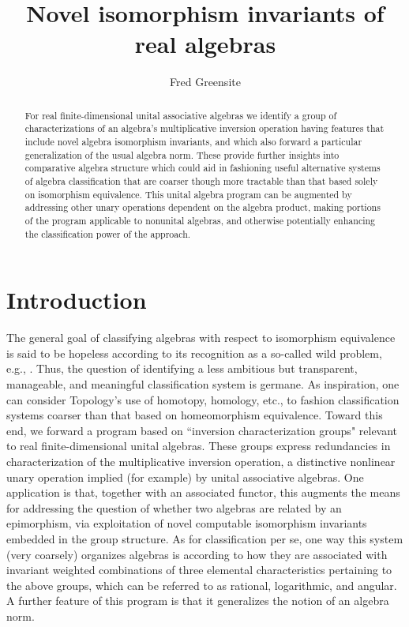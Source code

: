\documentclass{amsart}
\numberwithin{equation}{section}
\theoremstyle{definition}
\numberwithin{theorem}{section}
\begin{document}
       
             \title{Novel isomorphism invariants of real algebras}
    \author{Fred Greensite}
    
   \begin{abstract}  For real finite-dimensional unital associative algebras we identify a group of characterizations of an algebra's multiplicative inversion operation having features that include novel algebra isomorphism invariants, and which also forward a particular generalization of the usual algebra norm.  These provide further insights into comparative algebra structure which could aid in fashioning useful alternative systems of algebra classification that are coarser though more tractable than that based solely on isomorphism equivalence.  This unital algebra program can be augmented by addressing other unary operations dependent on the algebra product, making portions of the program applicable to nonunital algebras, and otherwise potentially enhancing the classification power of the approach.     
   \end{abstract}
        
  \maketitle
  
 \tableofcontents
 
  \section{Introduction} The general goal of classifying algebras with respect to isomorphism equivalence is said to be hopeless according to its recognition as a so-called wild problem, e.g., \cite{drozd:1972,prest:1991,sergeichuk:2000,belitskii:2005}.   Thus, the question of identifying a less ambitious but transparent, manageable, and meaningful classification system is germane.  As inspiration, one can consider Topology's use of homotopy, homology, etc., to fashion classification systems coarser than that based on homeomorphism equivalence.  Toward this end, we forward a program based on  ``inversion characterization groups" relevant to real finite-dimensional unital algebras.  These groups express redundancies in characterization of the multiplicative inversion operation, a distinctive nonlinear unary operation implied (for example) by unital associative algebras. One application is that, together with an associated functor, this augments the means for addressing the question of whether two algebras are related by an epimorphism, via exploitation of novel computable isomorphism invariants embedded in the group structure. As for classification per se, one way this system (very coarsely) organizes algebras is according to how they are associated with invariant weighted combinations of three elemental characteristics pertaining to the above groups, which can be referred to as rational, logarithmic, and angular.  
A further feature of this program is that it generalizes the notion of an algebra norm.  
  
\end{document}
